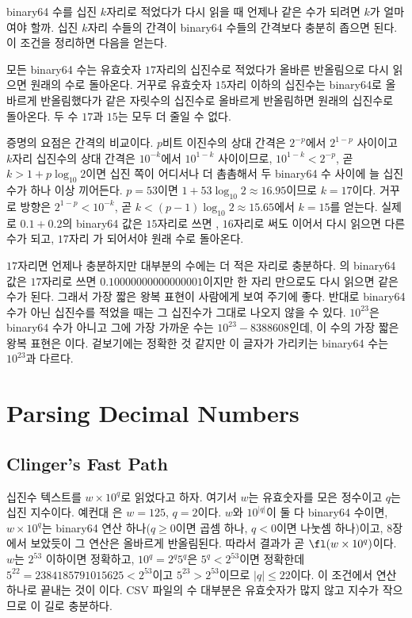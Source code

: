 binary64 수를 십진 $k$자리로 적었다가 다시 읽을 때 언제나 같은 수가 되려면 $k$가 얼마여야 할까. 십진 $k$자리 수들의 간격이 binary64 수들의 간격보다 충분히 좁으면 된다. 이 조건을 정리하면 다음을 얻는다\cite{matula1968}.

\begin{theorem}[Matula]
\label{thm:matula}
모든 binary64 수는 유효숫자 $17$자리의 십진수로 적었다가 올바른 반올림으로 다시 읽으면 원래의 수로 돌아온다. 거꾸로 유효숫자 $15$자리 이하의 십진수는 binary64로 올바르게 반올림했다가 같은 자릿수의 십진수로 올바르게 반올림하면 원래의 십진수로 돌아온다. 두 수 $17$과 $15$는 모두 더 줄일 수 없다.
\end{theorem}

증명의 요점은 간격의 비교이다. $p$비트 이진수의 상대 간격은 $2^{-p}$에서 $2^{1-p}$ 사이이고 $k$자리 십진수의 상대 간격은 $10^{-k}$에서 $10^{1-k}$ 사이이므로, $10^{1-k}<2^{-p}$, 곧 $k>1+p\log_{10}2$이면 십진 쪽이 어디서나 더 촘촘해서 두 binary64 수 사이에 늘 십진수가 하나 이상 끼어든다. $p=53$이면 $1+53\log_{10}2\approx16.95$이므로 $k=17$이다. 거꾸로 방향은 $2^{1-p}<10^{-k}$, 곧 $k<(p-1)\log_{10}2\approx15.65$에서 $k=15$를 얻는다. 실제로 $0.1+0.2$의 binary64 값은 $15$자리로 쓰면 , $16$자리로 써도 이어서 다시 읽으면 다른 수가 되고, $17$자리 가 되어서야 원래 수로 돌아온다.

$17$자리면 언제나 충분하지만 대부분의 수에는 더 적은 자리로 충분하다. 의 binary64 값은 $17$자리로 쓰면 $0.10000000000000001$이지만 한 자리 만으로도 다시 읽으면 같은 수가 된다. 그래서 가장 짧은 왕복 표현이 사람에게 보여 주기에 좋다. 반대로 binary64 수가 아닌 십진수를 적었을 때는 그 십진수가 그대로 나오지 않을 수 있다. $10^{23}$은 binary64 수가 아니고 그에 가장 가까운 수는 $10^{23}-8388608$인데, 이 수의 가장 짧은 왕복 표현은 이다. 겉보기에는 정확한 것 같지만 이 글자가 가리키는 binary64 수는 $10^{23}$과 다르다.

\section{Parsing Decimal Numbers}
\label{sec:parsing}

\subsection{Clinger's Fast Path}

십진수 텍스트를 $w\times10^q$로 읽었다고 하자. 여기서 $w$는 유효숫자를 모은 정수이고 $q$는 십진 지수이다. 예컨대 은 $w=125$, $q=2$이다. $w$와 $10^{|q|}$이 둘 다 binary64 수이면, $w\times10^q$는 binary64 연산 하나($q\ge0$이면 곱셈 하나, $q<0$이면 나눗셈 하나)이고, 8장에서 보았듯이 그 연산은 올바르게 반올림된다. 따라서 결과가 곧 $\fl(w\times10^q)$이다. $w$는 $2^{53}$ 이하이면 정확하고, $10^q=2^q5^q$은 $5^q<2^{53}$이면 정확한데 $5^{22}=2384185791015625<2^{53}$이고 $5^{23}>2^{53}$이므로 $|q|\le22$이다. 이 조건에서 연산 하나로 끝내는 것이 이다\cite{clinger1990}. CSV 파일의 수 대부분은 유효숫자가 많지 않고 지수가 작으므로 이 길로 충분하다.

